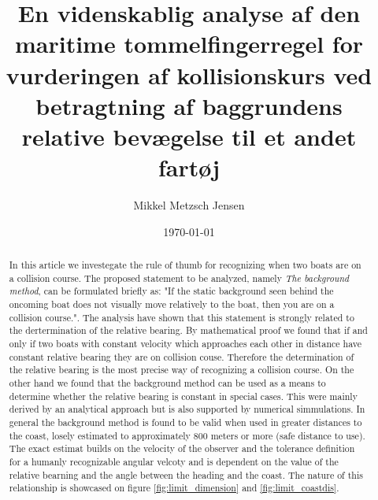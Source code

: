 \documentclass[%
 reprint,
nofootinbib,
aps,
]{revtex4-1}
\begin{document}
\title{En videnskablig analyse af den maritime tommelfingerregel for vurderingen af kollisionskurs ved betragtning af baggrundens relative bevægelse til et andet fartøj}
\author{Mikkel Metzsch Jensen}

\date{\today}


\begin{abstract}
  In this article we investegate the rule of thumb for recognizing when two boats are on a collision course. The proposed statement to be analyzed, namely \textit{The background method}, can be formulated briefly as: "If the static background seen behind the oncoming boat does not visually move relatively to the boat, then you are on a collision course.". The analysis have shown that this statement is strongly related to the dertermination of the relative bearing. By mathematical proof we found that if and only if two boats with constant velocity which approaches each other in distance have constant relative bearing they are on collision couse. Therefore the determination of the relative bearing is the most precise way of recognizing a collision course. On the other hand we found that the background method can be used as a means to determine whether the relative bearing is constant in special cases. This were mainly derived by an analytical approach but is also supported by numerical simmulations. In general the background method is found to be valid when used in greater distances to the coast, losely estimated to approximately 800 meters or more (safe distance to use). The exact estimat builds on the velocity of the observer and the tolerance definition for a humanly recognizable angular velcoty and is dependent on the value of the relative bearning and the angle between the heading and the coast. The nature of this relationship is showcased on figure \ref{fig:limit_dimension} and \ref{fig:limit_coastdis}.
\end{abstract}


\maketitle
\end{document}
